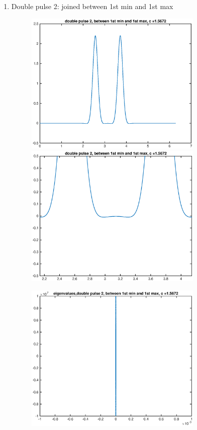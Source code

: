 \documentclass[12pt]{article}
\begin{document}
\begin{enumerate}
	\item Double pulse 2: joined between 1st min and 1st max
	\begin{figure}[H]
	\includegraphics[width=8.5cm]{KdVdouble2.eps}
	\includegraphics[width=8.5cm]{KdVdouble2zoom.eps}
	\end{figure}
	\begin{figure}[H]
	\includegraphics[width=8.5cm]{KdVdouble2eig.eps}
	\end{figure}
\end{enumerate}
\end{document}
